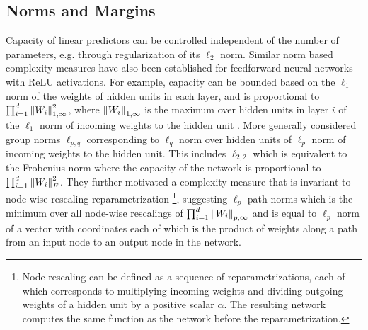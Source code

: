 \documentclass{article}
\begin{document}




\subsection{Norms and Margins}\label{sec:margin}

Capacity of linear predictors can be controlled independent of the
number of parameters, e.g. through regularization of its $\ell_2$ norm.
Similar norm based complexity measures have also been established
for feedforward neural networks with ReLU activations. For
example, capacity can be bounded based on the $\ell_1$ norm of the
weights of hidden units in each layer, and is proportional to
$\prod_{i=1}^d \left\lVert{W_i}\right\rVert^2_{1,\infty}$, where $\left\lVert{W_i}\right\rVert_{1,\infty}$
is the maximum over hidden units in layer $i$ of the $\ell_1$ norm of
incoming weights to the hidden unit \cite{bartlett2002rademacher}.
More generally \citet{NeyTomSre15} considered group norms $\ell_{p,
  q}$ corresponding to $\ell_q$ norm over hidden units of $\ell_p$
norm of incoming weights to the hidden unit. This includes
$\ell_{2,2}$ which is equivalent to the Frobenius norm where the
capacity of the network is proportional to $\prod_{i=1}^d
\left\lVert{W_i}\right\rVert^2_{F}$. They further motivated a complexity measure that is
invariant to node-wise rescaling reparametrization
\footnote{Node-rescaling can be defined as a sequence of
  reparametrizations, each of which corresponds to multiplying
  incoming weights and dividing outgoing weights of a hidden unit by a
  positive scalar $\alpha$. The resulting network computes the same
  function as the network before the reparametrization.}, suggesting
$\ell_p$ path norms which is the minimum over all node-wise rescalings
of $\prod_{i=1}^d \left\lVert{W_i}\right\rVert_{p,\infty}$ and is equal to $\ell_p$ norm
of a vector with coordinates each of which is the product of weights
along a path from an input node to an output node in the network.
\end{document}
